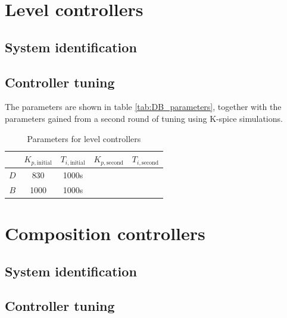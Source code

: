 \documentclass[12pt]{article}
\begin{document}


\newpage
\section{Level controllers}
\subsection{System identification}
\subsection{Controller tuning}
The parameters are shown in table \ref{tab:DB_parameters}, together with the parameters gained from a second round of tuning using K-spice simulations.

\begin{table}[h]
\centering
\begin{tabular}{c | c | c | c | c}
 & $K_{p, \textrm{initial}}$ & $T_{i, \textrm{initial}}$ & $K_{p, \textrm{second}}$ & $T_{i, \textrm{second}}$\\ \hline
 $D$ & 830 & 1000s & & \\
 $B$ & 1000 & 1000s & &
\end{tabular}
\caption{Parameters for level controllers}
\end{table}

\newpage
\section{Composition controllers}
\subsection{System identification}
\subsection{Controller tuning}
\end{document}
